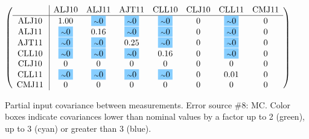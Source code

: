 \begin{table}[H]
\scriptsize
\begin{center}
\renewcommand{\arraystretch}{1.1}
\begin{math}\left(\begin{array}{c|ccccccc}
 & \mathrm{ALJ10} & 
\mathrm{ALJ11} & 
\mathrm{AJT11} & 
\mathrm{CLL10} & 
\mathrm{CLJ10} & 
\mathrm{CLL11} & 
\mathrm{CMJ11} \\
\hline
\mathrm{ALJ10} \hspace*{2pt} &       1.00 &  \colorbox{SkyBlue1}{$ {\scriptstyle \sim }0$} &  \colorbox{SkyBlue1}{$ {\scriptstyle \sim }0$} &  \colorbox{SkyBlue1}{$ {\scriptstyle \sim }0$} &  0 &  \colorbox{SkyBlue1}{$ {\scriptstyle \sim }0$} &  0 \\
\mathrm{ALJ11} \hspace*{2pt} &  \colorbox{SkyBlue1}{$ {\scriptstyle \sim }0$} &       0.16 &  \colorbox{SkyBlue1}{$ {\scriptstyle \sim }0$} &  \colorbox{SkyBlue1}{$ {\scriptstyle \sim }0$} &  0 &  \colorbox{SkyBlue1}{$ {\scriptstyle \sim }0$} &  0 \\
\mathrm{AJT11} \hspace*{2pt} &  \colorbox{SkyBlue1}{$ {\scriptstyle \sim }0$} &  \colorbox{SkyBlue1}{$ {\scriptstyle \sim }0$} &       0.25 &  \colorbox{SkyBlue1}{$ {\scriptstyle \sim }0$} &  0 &  \colorbox{SkyBlue1}{$ {\scriptstyle \sim }0$} &  0 \\
\mathrm{CLL10} \hspace*{2pt} &  \colorbox{SkyBlue1}{$ {\scriptstyle \sim }0$} &  \colorbox{SkyBlue1}{$ {\scriptstyle \sim }0$} &  \colorbox{SkyBlue1}{$ {\scriptstyle \sim }0$} &       0.16 &  0 &  \colorbox{SkyBlue1}{$ {\scriptstyle \sim }0$} &  0 \\
\mathrm{CLJ10} \hspace*{2pt} &  0 &  0 &  0 &  0 &  0 &  0 &  0 \\
\mathrm{CLL11} \hspace*{2pt} &  \colorbox{SkyBlue1}{$ {\scriptstyle \sim }0$} &  \colorbox{SkyBlue1}{$ {\scriptstyle \sim }0$} &  \colorbox{SkyBlue1}{$ {\scriptstyle \sim }0$} &  \colorbox{SkyBlue1}{$ {\scriptstyle \sim }0$} &  0 &       0.01 &  0 \\
\mathrm{CMJ11} \hspace*{2pt} &  0 &  0 &  0 &  0 &  0 &  0 &  0 \\
\end{array}\right)\end{math}
\caption{Partial input covariance between measurements. Error source \#8: MC. Color boxes indicate covariances lower than nominal values by a factor up to 2 (green), up to 3 (cyan) or greater than 3 (blue).}
\renewcommand{\arraystretch}{1}
\end{center}
\end{table}
